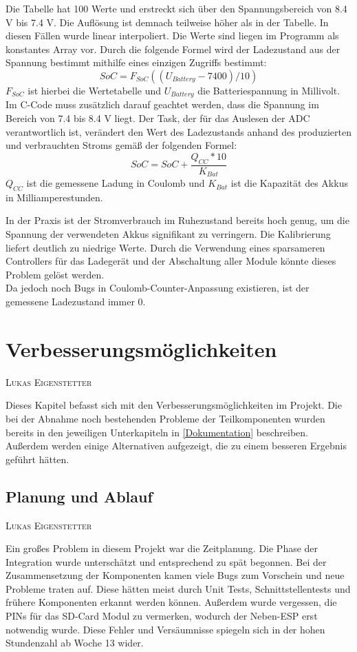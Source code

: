 \documentclass[12pt,a4paper,bibliography=totocnumbered,listof=totocnumbered]{article}
\makeatletter
\newcommand{\chapterauthor}[1]{%
  {\parindent0pt\vspace*{-5pt}%
  \linespread{1.1}\small\scshape#1%
  \par\nobreak\vspace*{3pt}}
  \@afterheading%
}
\makeatother
\begin{document}
Die Tabelle hat 100 Werte und erstreckt sich über den Spannungsbereich von 8.4 V bis 7.4 V.
Die Auflösung ist demnach teilweise höher als in der Tabelle.
In diesen Fällen wurde linear interpoliert.
Die Werte sind liegen im Programm als konstantes Array vor.
Durch die folgende Formel wird der Ladezustand aus der Spannung bestimmt mithilfe eines einzigen Zugriffs bestimmt:
$$ SoC = F_{SoC}((U_{Battery} - 7400) / 10) $$
$F_{SoC}$ ist hierbei die Wertetabelle und $U_{Battery}$ die Batteriespannung in Millivolt.
Im C-Code muss zusätzlich darauf geachtet werden, dass die Spannung im Bereich von 7.4 bis 8.4 V liegt.
Der Task, der für das Auslesen der ADC verantwortlich ist, verändert den Wert des Ladezustands anhand des produzierten und verbrauchten Stroms gemäß der folgenden Formel:\\
$$ SoC = SoC + \frac{Q_{CC} * 10}{K_{Bat}} $$ %
$ Q_{CC} $ ist die gemessene Ladung in Coulomb und $ K_{Bat} $ ist die Kapazität des Akkus in Milliamperestunden.

In der Praxis ist der Stromverbrauch im Ruhezustand bereits hoch genug, um die Spannung der verwendeten Akkus signifikant zu verringern.
Die Kalibrierung liefert deutlich zu niedrige Werte.
Durch die Verwendung eines sparsameren Controllers für das Ladegerät und der Abschaltung aller Module könnte dieses Problem gelöst werden.\\
Da jedoch noch Bugs in Coulomb-Counter-Anpassung existieren, ist der gemessene Ladezustand immer 0. \autocite[S. 139 - 158]{chargerBuch}
\newpage
\section{Verbesserungsmöglichkeiten}
\chapterauthor{Lukas Eigenstetter}
Dieses Kapitel befasst sich mit den Verbesserungsmöglichkeiten im Projekt.
Die bei der Abnahme noch bestehenden Probleme der Teilkomponenten wurden bereits in den jeweiligen Unterkapiteln in \autoref{Dokumentation} beschreiben.
Außerdem werden einige Alternativen aufgezeigt, die zu einem besseren Ergebnis geführt hätten.

\subsection{Planung und Ablauf}
\chapterauthor{Lukas Eigenstetter}
Ein großes Problem in diesem Projekt war die Zeitplanung.
Die Phase der Integration wurde unterschätzt und entsprechend zu spät begonnen.
Bei der Zusammensetzung der Komponenten kamen viele Bugs zum Vorschein und neue Probleme traten auf.
Diese hätten meist durch Unit Tests, Schnittstellentests und frühere Komponenten erkannt werden können.
Außerdem wurde vergessen, die PINs für das SD-Card Modul zu vermerken, wodurch der Neben-ESP erst notwendig wurde.
Diese Fehler und Versäumnisse spiegeln sich in der hohen Stundenzahl ab Woche 13 wider.
\end{document}
